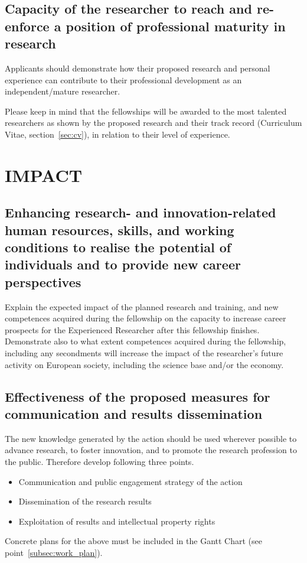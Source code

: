 \documentclass[a4paper,11pt]{article}
\begin{document}
\subsection{Capacity of the researcher to reach and re-enforce a position of professional maturity in research}
\label{sec:maturity}

Applicants should demonstrate how their proposed research and personal experience can contribute to their professional development as an independent/mature researcher.

Please keep in mind that the fellowships will be awarded to the most talented researchers as shown by the proposed research and their track record (Curriculum Vitae, section~\ref{sec:cv}), in relation to their level of experience.

\section{IMPACT}
\label{sec:impact}

\subsection{Enhancing research- and innovation-related human resources, skills, and working conditions to realise the potential of individuals and to provide new career perspectives}
\label{sec:enhancement}

Explain the expected impact of the planned research and training, and new competences acquired during the fellowship on the capacity to increase career prospects for the Experienced Researcher after this fellowship finishes.
Demonstrate also to what extent competences acquired during the fellowship, including any secondments will increase the impact of the researcher’s future activity on European society, including the science base and/or the economy.  

\subsection{Effectiveness of the proposed measures for communication and results dissemination}

The new knowledge generated by the action should be used wherever possible to
advance research, to foster innovation, and to promote the research profession
to the public. Therefore develop following three points.
\begin{itemize}
\item Communication and public engagement strategy of the action 
\item Dissemination of the research results 
\item Exploitation of results and intellectual property rights
\end{itemize}
Concrete plans for the above must be included in the Gantt Chart (see point~\ref{subsec:work_plan}).
\end{document}
